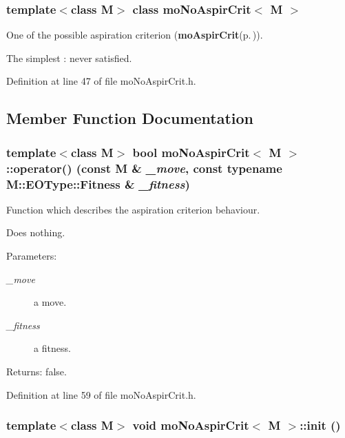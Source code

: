 \subsubsection*{template$<$class M$>$ class mo\-No\-Aspir\-Crit$<$ M $>$}

One of the possible aspiration criterion ({\bf mo\-Aspir\-Crit}{\rm (p.\,\pageref{classmo_aspir_crit})}). 

The simplest : never satisfied. 



Definition at line 47 of file mo\-No\-Aspir\-Crit.h.

\subsection{Member Function Documentation}
\subsubsection{\setlength{\rightskip}{0pt plus 5cm}template$<$class M$>$ bool {\bf mo\-No\-Aspir\-Crit}$<$ M $>$::operator() (const M \& {\em \_\-move}, const typename M::EOType::Fitness \& {\em \_\-fitness})\hspace{0.3cm}{\tt  [inline]}}\label{classmo_no_aspir_crit_a0}


Function which describes the aspiration criterion behaviour. 

Does nothing.

\begin{Desc}
\item[Parameters:]
\begin{description}
\item[{\em \_\-move}]a move. \item[{\em \_\-fitness}]a fitness. \end{description}
\end{Desc}
\begin{Desc}
\item[Returns:]false. \end{Desc}


Definition at line 59 of file mo\-No\-Aspir\-Crit.h.
\subsubsection{\setlength{\rightskip}{0pt plus 5cm}template$<$class M$>$ void {\bf mo\-No\-Aspir\-Crit}$<$ M $>$::init ()\hspace{0.3cm}{\tt  [inline, virtual]}}\label{classmo_no_aspir_crit_a1}


